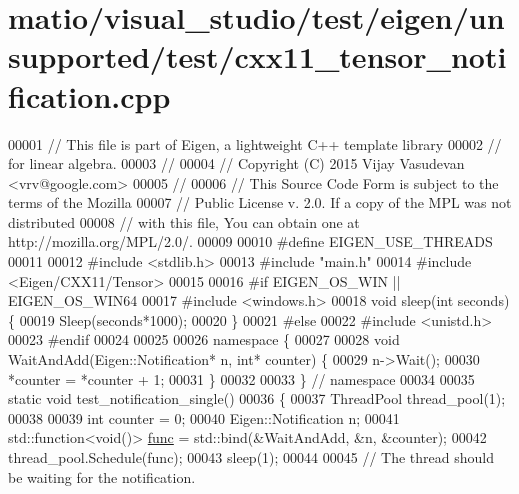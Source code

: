 \hypertarget{matio_2visual__studio_2test_2eigen_2unsupported_2test_2cxx11__tensor__notification_8cpp_source}{}\section{matio/visual\+\_\+studio/test/eigen/unsupported/test/cxx11\+\_\+tensor\+\_\+notification.cpp}
\label{matio_2visual__studio_2test_2eigen_2unsupported_2test_2cxx11__tensor__notification_8cpp_source}

\begin{DoxyCode}
00001 \textcolor{comment}{// This file is part of Eigen, a lightweight C++ template library}
00002 \textcolor{comment}{// for linear algebra.}
00003 \textcolor{comment}{//}
00004 \textcolor{comment}{// Copyright (C) 2015 Vijay Vasudevan <vrv@google.com>}
00005 \textcolor{comment}{//}
00006 \textcolor{comment}{// This Source Code Form is subject to the terms of the Mozilla}
00007 \textcolor{comment}{// Public License v. 2.0. If a copy of the MPL was not distributed}
00008 \textcolor{comment}{// with this file, You can obtain one at http://mozilla.org/MPL/2.0/.}
00009 
00010 \textcolor{preprocessor}{#define EIGEN\_USE\_THREADS}
00011 
00012 \textcolor{preprocessor}{#include <stdlib.h>}
00013 \textcolor{preprocessor}{#include "main.h"}
00014 \textcolor{preprocessor}{#include <Eigen/CXX11/Tensor>}
00015 
00016 \textcolor{preprocessor}{#if EIGEN\_OS\_WIN || EIGEN\_OS\_WIN64}
00017 \textcolor{preprocessor}{#include <windows.h>}
00018 \textcolor{keywordtype}{void} sleep(\textcolor{keywordtype}{int} seconds) \{
00019   Sleep(seconds*1000);
00020 \}
00021 \textcolor{preprocessor}{#else}
00022 \textcolor{preprocessor}{#include <unistd.h>}
00023 \textcolor{preprocessor}{#endif}
00024 
00025 
00026 \textcolor{keyword}{namespace }\{
00027 
00028 \textcolor{keywordtype}{void} WaitAndAdd(Eigen::Notification* n, \textcolor{keywordtype}{int}* counter) \{
00029   n->Wait();
00030   *counter = *counter + 1;
00031 \}
00032 
00033 \}  \textcolor{comment}{// namespace}
00034 
00035 \textcolor{keyword}{static} \textcolor{keywordtype}{void} test\_notification\_single()
00036 \{
00037   ThreadPool thread\_pool(1);
00038 
00039   \textcolor{keywordtype}{int} counter = 0;
00040   Eigen::Notification n;
00041   std::function<void()> \hyperlink{structfunc}{func} = std::bind(&WaitAndAdd, &n, &counter);
00042   thread\_pool.Schedule(func);
00043   sleep(1);
00044 
00045   \textcolor{comment}{// The thread should be waiting for the notification.}

\end{DoxyCode}
